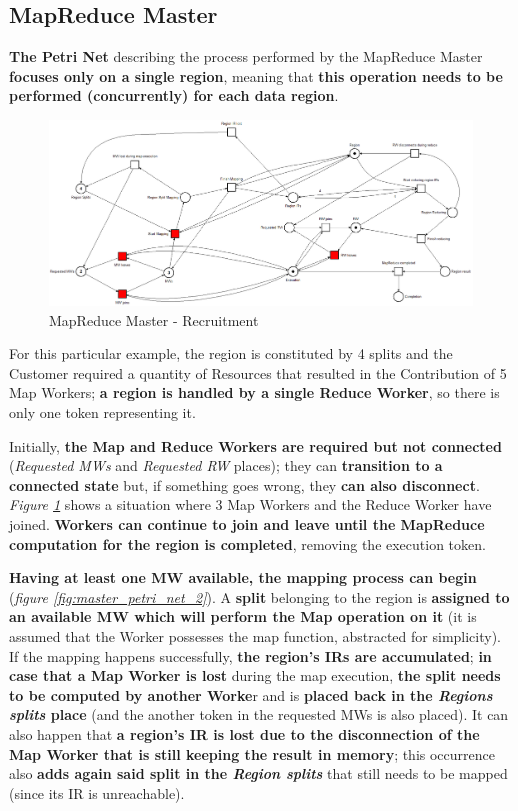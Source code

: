 \subsection{MapReduce Master}
\textbf{The Petri Net} describing the process performed by the MapReduce Master \textbf{focuses only on a single region}, meaning that \textbf{this operation needs to be performed (concurrently) for each data region}. 
\begin{figure}[!ht]
    \centering
    \includegraphics[width=\linewidth]{document/chapters/chapter_6/images/master_petri_net_1.png}
    \caption{MapReduce Master - Recruitment}
    \label{fig:master_petri_net_1}
\end{figure}

For this particular example, the region is constituted by 4 splits and the Customer required a quantity of Resources that resulted in the Contribution of 5 Map Workers; \textbf{a region is handled by a single Reduce Worker}, so there is only one token representing it.

Initially, \textbf{the Map and Reduce Workers are required but not connected} (\textit{Requested MWs} and \textit{Requested RW} places); they can \textbf{transition to a connected state} but, if something goes wrong, they \textbf{can also disconnect}. \textit{Figure \ref{fig:master_petri_net_1}} shows a situation where 3 Map Workers and the Reduce Worker have joined. \textbf{Workers can continue to join and leave until the MapReduce computation for the region is completed}, removing the execution token.

\textbf{Having at least one MW available, the mapping process can begin} (\textit{figure \ref{fig:master_petri_net_2}}). A \textbf{split} belonging to the region is \textbf{assigned to an available MW which will perform the Map operation on it} (it is assumed that the Worker possesses the map function, abstracted for simplicity). If the mapping happens successfully, \textbf{the region's IRs are accumulated}; \textbf{in case that a Map Worker is lost} during the map execution, \textbf{the split needs to be computed by another Worke}r and is \textbf{placed back in the \textit{Regions splits} place} (and the another token in the requested MWs is also placed).
It can also happen that \textbf{a region's IR is lost due to the disconnection of the Map Worker that is still keeping the result in memory}; this occurrence also \textbf{adds again said split in the \textit{Region splits}} that still needs to be mapped (since its IR is unreachable).


